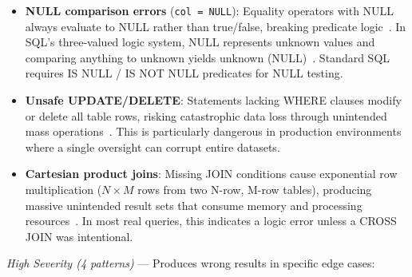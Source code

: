 \documentclass[print]{einformatica}
\begin{document}
\begin{itemize}
\item \textbf{NULL comparison errors} (\texttt{col = NULL}): Equality operators with NULL always evaluate to NULL rather than true/false, breaking predicate logic~\cite{karwin2010sqlantipatterns,date2012sqlrelational}. In SQL's three-valued logic system, NULL represents unknown values and comparing anything to unknown yields unknown (NULL)~\cite{date2012sqlrelational,iso9075_2_2016}. Standard SQL requires IS NULL / IS NOT NULL predicates for NULL testing.

\item \textbf{Unsafe UPDATE/DELETE}: Statements lacking WHERE clauses modify or delete all table rows, risking catastrophic data loss through unintended mass operations~\cite{karwin2010sqlantipatterns}. This is particularly dangerous in production environments where a single oversight can corrupt entire datasets.

\item \textbf{Cartesian product joins}: Missing JOIN conditions cause exponential row multiplication ($N \times M$ rows from two N-row, M-row tables), producing massive unintended result sets that consume memory and processing resources~\cite{karwin2010sqlantipatterns,ramakrishnan2003dbms}. In most real queries, this indicates a logic error unless a CROSS JOIN was intentional.
\end{itemize}

\textit{High Severity (4 patterns)} --- Produces wrong results in specific edge cases:
\end{document}
